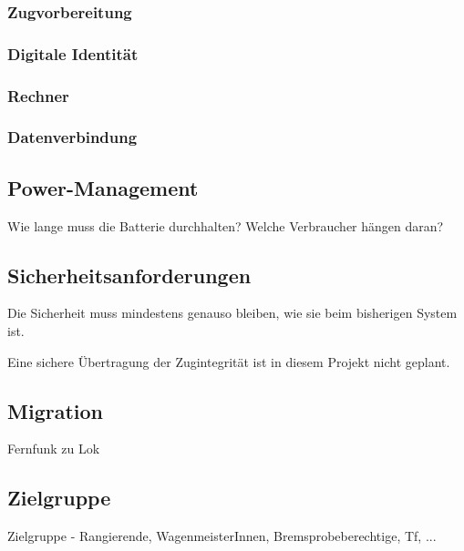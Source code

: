 \subsubsection{Zugvorbereitung}
\subsubsection{Digitale Identität}
\subsubsection{Rechner}
\subsubsection{Datenverbindung}

\subsection{Power-Management}
Wie lange muss die Batterie durchhalten? Welche Verbraucher hängen daran?


\subsection{Sicherheitsanforderungen}
Die Sicherheit muss mindestens genauso bleiben, wie sie beim bisherigen System ist.\par
Eine sichere Übertragung der Zugintegrität ist in diesem Projekt nicht geplant.

\subsection{Migration}
Fernfunk zu Lok
\subsection{Zielgruppe}
Zielgruppe - Rangierende, WagenmeisterInnen, Bremsprobeberechtige, Tf, ...